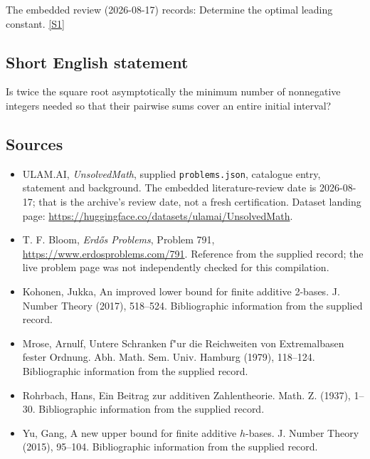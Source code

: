 \documentclass[11pt,a4paper]{article}
\newcommand{\sref}[2]{\hyperlink{source:#1:#2}{[S#2]}}
\begin{document}
The embedded review (2026-08-17) records: Determine the optimal leading constant. \sref{statement}{1}

\subsection{Short English statement}

Is twice the square root asymptotically the minimum number of nonnegative integers needed so that their pairwise sums cover an entire initial interval?

\subsection{Sources}

{\small

\begin{itemize}

\item[\hypertarget{source:statement:1}{S1}] ULAM.AI, \emph{UnsolvedMath}, supplied \texttt{problems.json}, catalogue entry, statement and background. The embedded literature-review date is 2026-08-17; that is the archive’s review date, not a fresh certification. Dataset landing page: \url{https://huggingface.co/datasets/ulamai/UnsolvedMath}.

\item[\hypertarget{source:statement:2}{S2}] T. F. Bloom, \emph{Erdős Problems}, Problem 791, \url{https://www.erdosproblems.com/791}. Reference from the supplied record; the live problem page was not independently checked for this compilation.

\item[\hypertarget{source:statement:3}{S3}] Kohonen, Jukka, An improved lower bound for finite additive 2-bases. J. Number Theory (2017), 518--524. Bibliographic information from the supplied record.

\item[\hypertarget{source:statement:4}{S4}] Mrose, Arnulf, Untere {S}chranken f"ur die {R}eichweiten von {E}xtremalbasen fester {O}rdnung. Abh. Math. Sem. Univ. Hamburg (1979), 118--124. Bibliographic information from the supplied record.

\item[\hypertarget{source:statement:5}{S5}] Rohrbach, Hans, Ein {B}eitrag zur additiven {Z}ahlentheorie. Math. Z. (1937), 1--30. Bibliographic information from the supplied record.

\item[\hypertarget{source:statement:6}{S6}] Yu, Gang, A new upper bound for finite additive {$h$}-bases. J. Number Theory (2015), 95--104. Bibliographic information from the supplied record.

\end{itemize}

}

\label{end:statement}
\end{document}
